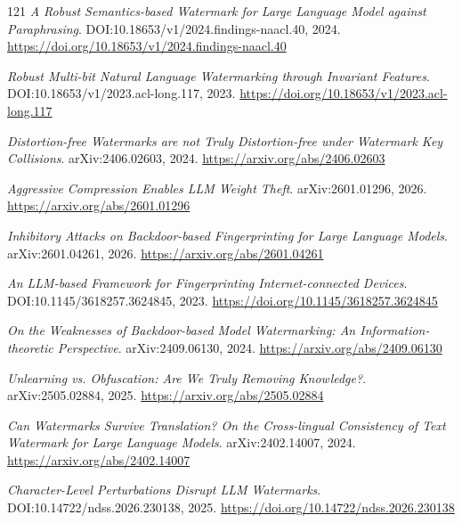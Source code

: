 \documentclass[11pt,a4paper]{article}
\begin{document}
\begin{thebibliography}{121}
\newblock \emph{A Robust Semantics-based Watermark for Large Language Model against Paraphrasing}.
\newblock DOI:10.18653/v1/2024.findings-naacl.40, 2024.
\newblock \url{https://doi.org/10.18653/v1/2024.findings-naacl.40}

\newblock \emph{Robust Multi-bit Natural Language Watermarking through Invariant Features}.
\newblock DOI:10.18653/v1/2023.acl-long.117, 2023.
\newblock \url{https://doi.org/10.18653/v1/2023.acl-long.117}

\newblock \emph{Distortion-free Watermarks are not Truly Distortion-free under Watermark Key Collisions}.
\newblock arXiv:2406.02603, 2024.
\newblock \url{https://arxiv.org/abs/2406.02603}

\newblock \emph{Aggressive Compression Enables LLM Weight Theft}.
\newblock arXiv:2601.01296, 2026.
\newblock \url{https://arxiv.org/abs/2601.01296}

\newblock \emph{Inhibitory Attacks on Backdoor-based Fingerprinting for Large Language Models}.
\newblock arXiv:2601.04261, 2026.
\newblock \url{https://arxiv.org/abs/2601.04261}

\newblock \emph{An LLM-based Framework for Fingerprinting Internet-connected Devices}.
\newblock DOI:10.1145/3618257.3624845, 2023.
\newblock \url{https://doi.org/10.1145/3618257.3624845}

\newblock \emph{On the Weaknesses of Backdoor-based Model Watermarking: An Information-theoretic Perspective}.
\newblock arXiv:2409.06130, 2024.
\newblock \url{https://arxiv.org/abs/2409.06130}

\newblock \emph{Unlearning vs. Obfuscation: Are We Truly Removing Knowledge?}.
\newblock arXiv:2505.02884, 2025.
\newblock \url{https://arxiv.org/abs/2505.02884}

\newblock \emph{Can Watermarks Survive Translation? On the Cross-lingual Consistency of Text Watermark for Large Language Models}.
\newblock arXiv:2402.14007, 2024.
\newblock \url{https://arxiv.org/abs/2402.14007}

\newblock \emph{Character-Level Perturbations Disrupt LLM Watermarks}.
\newblock DOI:10.14722/ndss.2026.230138, 2025.
\newblock \url{https://doi.org/10.14722/ndss.2026.230138}


\end{thebibliography}
\end{document}
